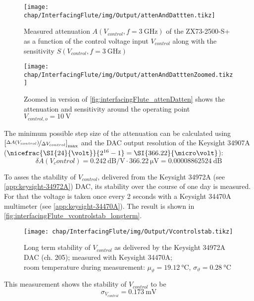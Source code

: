 \begin{figure}[tb]
	\centering
	\texttt{[image: chap/InterfacingFlute/img/Output/attenAndDattten.tikz]}
	\caption{Measured attenuation $A(V_{control},f=\SI{3}{\GHz})$ of the ZX73-2500-S+ as a function of the control voltage input $V_{control}$ along with the sensitivity $S(V_{control},f=\SI{3}{\GHz})$}
	\label{fig:interfacingFlute_attenDatten}
\end{figure}

\begin{figure}[tb]
	\centering
	\texttt{[image: chap/InterfacingFlute/img/Output/attenAndDatttenZoomed.tikz]}
	\caption{Zoomed in version of \autoref{fig:interfacingFlute_attenDatten} shows the attenuation and sensitivity around the operating point $V_{control,o}=\SI{10}{\volt}$}
	\label{fig:interfacingFlute_attenDattenZoomed}
\end{figure}

The minimum possible step size of the attenuation can be calculated using $\left[\nicefrac{\Delta A(V_{control})}{\Delta V_{control}}\right]_{\text{max}}$ and the DAC output resolution of the Keysight 34907A ($\nicefrac{\SI{24}{\volt}}{2^{16}-1}=\SI{366.22}{\micro\volt}$):
\begin{equation}
\delta A(V_control) = \SI{0.242}{\dB\per\volt} \cdot \SI{366.22}{\micro\volt} = \SI{0.00008862524}{\dB}
\end{equation}

To asses the stability of $V_{control}$, delivered from the Keysight 34972A (see \autoref{app:keysight-34972A}) DAC, its stability over the course of one day is measured. For that the voltage is taken once every 2 seconds with a Keysight 34470A multimeter (see \autoref{app:keysight-34470A}). The result is shown in \autoref{fig:interfacingFlute_vcontrolstab_longterm}.

\begin{figure}[tb]
	\centering
	\texttt{[image: chap/InterfacingFlute/img/Output/Vcontrolstab.tikz]}
	\caption{Long term stability of $V_{control}$ as delivered by the Keysight 34972A DAC (ch. 205); measured with Keysight 34470A;\\room temperature during measurement: $\mu_\vartheta=\SI{19.12}{\degreeCelsius}$, $\sigma_\vartheta=\SI{0.28}{\degreeCelsius}$}
	\label{fig:interfacingFlute_vcontrolstab_longterm}
\end{figure}

This measurement shows the stability of $V_{control}$ to be
\begin{equation}
\sigma_{V_{control}} = \SI{0.173}{\milli\volt}
\end{equation}

